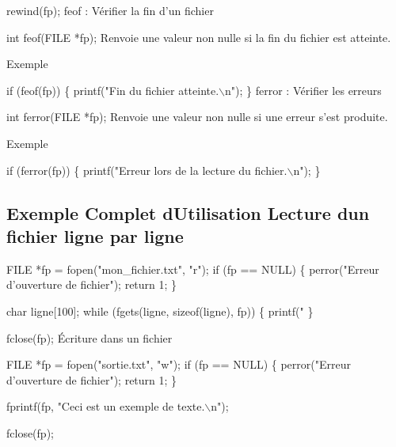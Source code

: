 \begin{DoxyCode}
rewind(fp);
feof : Vérifier la fin d'un fichier

int feof(FILE *fp);
Renvoie une valeur non nulle si la fin du fichier est atteinte.
\end{DoxyCode}

\begin{DoxyItemize}
\item Exemple
\end{DoxyItemize}


\begin{DoxyCode}
if (feof(fp)) \{
    printf("Fin du fichier atteinte.\(\backslash\)n");
\}
ferror : Vérifier les erreurs

int ferror(FILE *fp);
Renvoie une valeur non nulle si une erreur s'est produite.
\end{DoxyCode}

\begin{DoxyItemize}
\item Exemple
\end{DoxyItemize}


\begin{DoxyCode}
if (ferror(fp)) \{
    printf("Erreur lors de la lecture du fichier.\(\backslash\)n");
\}
\end{DoxyCode}
 \subsection*{Exemple Complet d\textquotesingle{}Utilisation Lecture d\textquotesingle{}un fichier ligne par ligne}


\begin{DoxyCode}
FILE *fp = fopen("mon\_fichier.txt", "r");
if (fp == NULL) \{
    perror("Erreur d'ouverture de fichier");
    return 1;
\}

char ligne[100];
while (fgets(ligne, sizeof(ligne), fp)) \{
    printf("%
\}

fclose(fp);
Écriture dans un fichier

FILE *fp = fopen("sortie.txt", "w");
if (fp == NULL) \{
    perror("Erreur d'ouverture de fichier");
    return 1;
\}

fprintf(fp, "Ceci est un exemple de texte.\(\backslash\)n");

fclose(fp);
\end{DoxyCode}
 